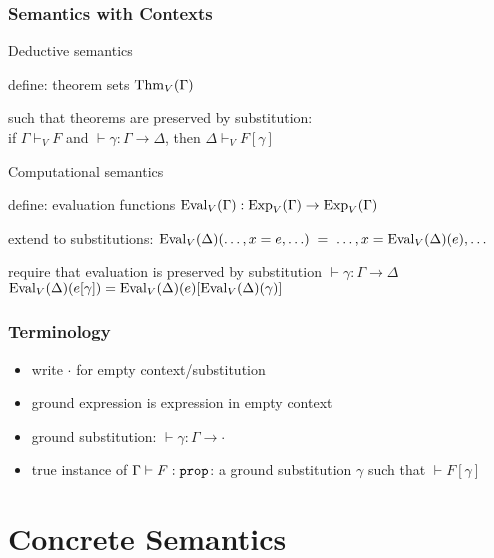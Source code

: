 \begin{frame}\frametitle{Semantics with Contexts}
\begin{blockitems}{Deductive semantics}
\item define: theorem sets $\mathrm{Thm}_V(\Gamma)$
\item such that theorems are preserved by substitution: \\
 if $\Gamma\vdash_V F$ and $\vdash \gamma:\Gamma\to\Delta$, then $\Delta\vdash_V F[\gamma]$
\end{blockitems}

\begin{blockitems}{Computational semantics}
\item define: evaluation functions $\mathrm{Eval}_V(\Gamma):\mathrm{Exp}_V(\Gamma)\to\mathrm{Exp}_V(\Gamma)$
\item extend to substitutions: $\mathrm{Eval}_V(\Delta)(\ldots,x=e,\ldots)\;=\;\ldots,x=\mathrm{Eval}_V(\Delta)(e), \ldots$
\item require that evaluation is preserved by substitution $\vdash \gamma:\Gamma\to\Delta$ \\
  $\mathrm{Eval}_V(\Delta)(e[\gamma])=\mathrm{Eval}_V(\Delta)(e)[\mathrm{Eval}_V(\Delta)(\gamma)]$
\end{blockitems}
\end{frame}

\begin{frame}\frametitle{Terminology}
\begin{itemize}
\item write $\cdot$ for empty context/substitution
\item ground expression is expression in empty context
\item ground substitution: $\vdash \gamma:\Gamma\to \cdot$
\item true instance of $\Gamma\vdash F:\prop$: a ground substitution $\gamma$ such that $\vdash F[\gamma]$
\end{itemize}
\end{frame}


\section{Concrete Semantics}

